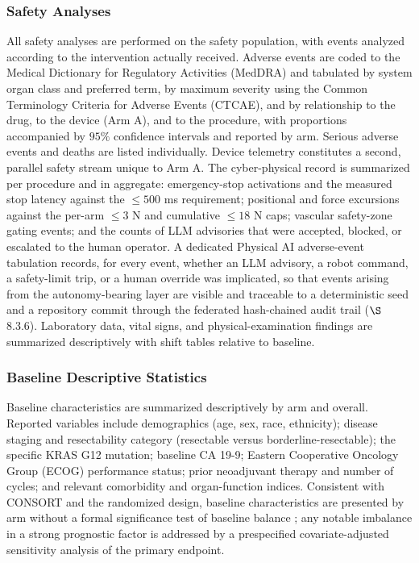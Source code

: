 \subsubsection{Safety Analyses}

All safety analyses are performed on the safety population, with events analyzed
according to the intervention actually received. Adverse events are coded to the
Medical Dictionary for Regulatory Activities (MedDRA) and tabulated by system organ
class and preferred term, by maximum severity using the Common Terminology Criteria
for Adverse Events (CTCAE), and by relationship to the drug, to the device (Arm A),
and to the procedure, with proportions accompanied by $95\%$ confidence intervals and
reported by arm. Serious adverse events and deaths are listed individually. Device
telemetry constitutes a second, parallel safety stream unique to Arm A. The
cyber-physical record is summarized per procedure and in aggregate: emergency-stop
activations and the measured stop latency against the $\leq 500$ ms requirement;
positional and force excursions against the per-arm $\leq 3$ N and cumulative
$\leq 18$ N caps; vascular safety-zone gating events; and the counts of LLM
advisories that were accepted, blocked, or escalated to the human operator. A
dedicated Physical AI adverse-event tabulation records, for every event, whether an
LLM advisory, a robot command, a safety-limit trip, or a human override was
implicated, so that events arising from the autonomy-bearing layer are visible and
traceable to a deterministic seed and a repository commit through the federated
hash-chained audit trail ($\S$8.3.6). Laboratory data, vital signs, and
physical-examination findings are summarized descriptively with shift tables relative
to baseline.

\subsubsection{Baseline Descriptive Statistics}

Baseline characteristics are summarized descriptively by arm and overall. Reported
variables include demographics (age, sex, race, ethnicity); disease staging and
resectability category (resectable versus borderline-resectable); the specific KRAS
G12 mutation; baseline CA 19-9; Eastern Cooperative Oncology Group (ECOG) performance
status; prior neoadjuvant therapy and number of cycles; and relevant comorbidity and
organ-function indices. Consistent with CONSORT and the randomized design, baseline
characteristics are presented by arm without a formal significance test of baseline
balance \cite{Schulz2010consort}; any notable imbalance in a strong prognostic factor
is addressed by a prespecified covariate-adjusted sensitivity analysis of the primary
endpoint.

